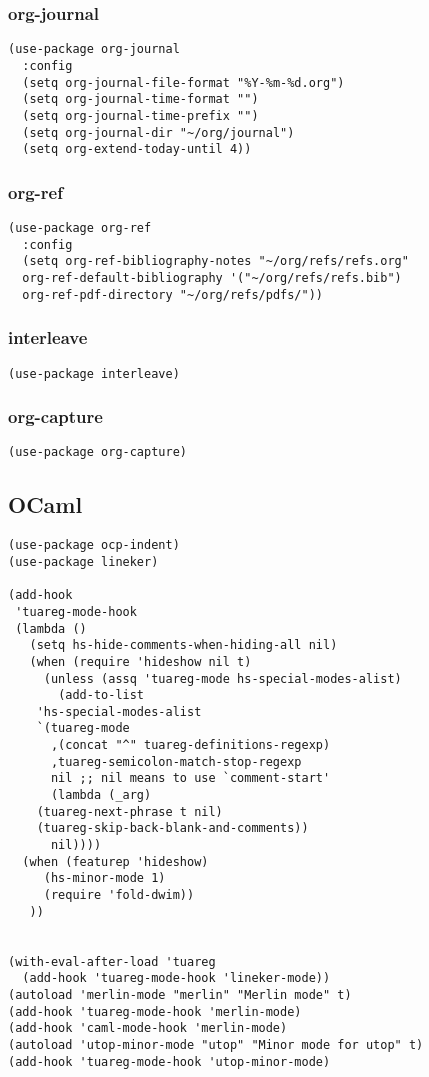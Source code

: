 \documentclass[11pt]{article}
\begin{document}
\subsubsection{org-journal}
\label{sec:org67ed17b}
\begin{verbatim}
(use-package org-journal
  :config
  (setq org-journal-file-format "%Y-%m-%d.org")
  (setq org-journal-time-format "")
  (setq org-journal-time-prefix "")
  (setq org-journal-dir "~/org/journal")
  (setq org-extend-today-until 4))
\end{verbatim}
\subsubsection{org-ref}
\label{sec:org63051a2}
\begin{verbatim}
(use-package org-ref
  :config
  (setq org-ref-bibliography-notes "~/org/refs/refs.org"
  org-ref-default-bibliography '("~/org/refs/refs.bib")
  org-ref-pdf-directory "~/org/refs/pdfs/"))
\end{verbatim}
\subsubsection{interleave}
\label{sec:org147503d}
\begin{verbatim}
(use-package interleave)
\end{verbatim}
\subsubsection{org-capture}
\label{sec:org79f4f9a}
\begin{verbatim}
(use-package org-capture)
\end{verbatim}
\subsection{OCaml}
\label{sec:orge112359}
\begin{verbatim}
(use-package ocp-indent)
(use-package lineker)

(add-hook
 'tuareg-mode-hook
 (lambda ()
   (setq hs-hide-comments-when-hiding-all nil)
   (when (require 'hideshow nil t)
     (unless (assq 'tuareg-mode hs-special-modes-alist)
       (add-to-list
    'hs-special-modes-alist
    `(tuareg-mode
      ,(concat "^" tuareg-definitions-regexp)
      ,tuareg-semicolon-match-stop-regexp
      nil ;; nil means to use `comment-start'
      (lambda (_arg)
	(tuareg-next-phrase t nil)
	(tuareg-skip-back-blank-and-comments))
      nil))))
  (when (featurep 'hideshow)
     (hs-minor-mode 1)
     (require 'fold-dwim))
   ))


(with-eval-after-load 'tuareg
  (add-hook 'tuareg-mode-hook 'lineker-mode))
(autoload 'merlin-mode "merlin" "Merlin mode" t)
(add-hook 'tuareg-mode-hook 'merlin-mode)
(add-hook 'caml-mode-hook 'merlin-mode)
(autoload 'utop-minor-mode "utop" "Minor mode for utop" t)
(add-hook 'tuareg-mode-hook 'utop-minor-mode)
\end{verbatim}
\end{document}
